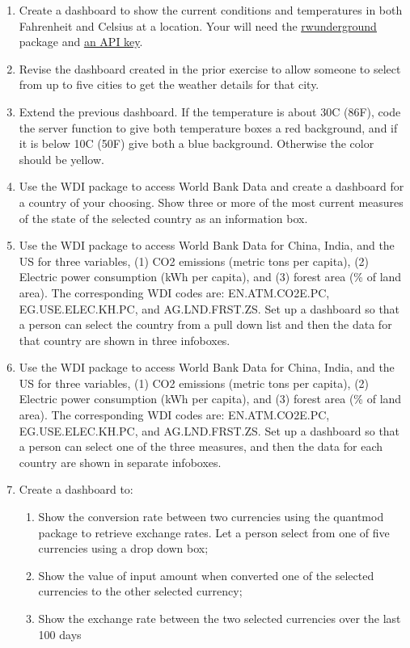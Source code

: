 \documentclass[
]{article}
\begin{document}
\begin{enumerate}
\def\labelenumi{\arabic{enumi}.}
\item
  Create a dashboard to show the current conditions and temperatures
  in both Fahrenheit and Celsius at a location. Your will need the
  \href{https://cran.r-project.org/web/packages/rwunderground/index.html}{\underline{rwunderground}}
  package and \href{https://www.wunderground.com/weather/api/d/docs}{\underline{an API
  key}}.
\item
  Revise the dashboard created in the prior exercise to allow someone
  to select from up to five cities to get the weather details for that
  city.
\item
  Extend the previous dashboard. If the temperature is about 30C
  (86F), code the server function to give both temperature boxes a red
  background, and if it is below 10C (50F) give both a blue
  background. Otherwise the color should be yellow.
\item
  Use the WDI package to access World Bank Data and create a dashboard
  for a country of your choosing. Show three or more of the most
  current measures of the state of the selected country as an
  information box.
\item
  Use the WDI package to access World Bank Data for China, India, and
  the US for three variables, (1) CO2 emissions (metric tons per
  capita), (2) Electric power consumption (kWh per capita), and (3)
  forest area (\% of land area). The corresponding WDI codes are:
  EN.ATM.CO2E.PC, EG.USE.ELEC.KH.PC, and AG.LND.FRST.ZS. Set up a
  dashboard so that a person can select the country from a pull down
  list and then the data for that country are shown in three
  infoboxes.
\item
  Use the WDI package to access World Bank Data for China, India, and
  the US for three variables, (1) CO2 emissions (metric tons per
  capita), (2) Electric power consumption (kWh per capita), and (3)
  forest area (\% of land area). The corresponding WDI codes are:
  EN.ATM.CO2E.PC, EG.USE.ELEC.KH.PC, and AG.LND.FRST.ZS. Set up a
  dashboard so that a person can select one of the three measures, and
  then the data for each country are shown in separate infoboxes.
\item
  Create a dashboard to:

  \begin{enumerate}
  \def\labelenumii{\alph{enumii}.}
  \item
    Show the conversion rate between two currencies using the quantmod
    package to retrieve exchange rates. Let a person select from one of
    five currencies using a drop down box;
  \item
    Show the value of input amount when converted one of the selected
    currencies to the other selected currency;
  \item
    Show the exchange rate between the two selected currencies over the
    last 100 days
  \end{enumerate}
\end{enumerate}
\end{document}
